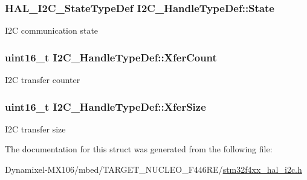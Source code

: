 \subsubsection[{\texorpdfstring{State}{State}}]{ {\bf H\+A\+L\+\_\+\+I2\+C\+\_\+\+State\+Type\+Def} I2\+C\+\_\+\+Handle\+Type\+Def\+::\+State}\hypertarget{struct_i2_c___handle_type_def_a5b37a3a29bc768fb1c3ff192ab94b6e3}{}\label{struct_i2_c___handle_type_def_a5b37a3a29bc768fb1c3ff192ab94b6e3}
I2C communication state 
\subsubsection[{\texorpdfstring{Xfer\+Count}{XferCount}}]{ uint16\+\_\+t I2\+C\+\_\+\+Handle\+Type\+Def\+::\+Xfer\+Count}\hypertarget{struct_i2_c___handle_type_def_a1860b3cf8f463c2751d0c935f33e0ad4}{}\label{struct_i2_c___handle_type_def_a1860b3cf8f463c2751d0c935f33e0ad4}
I2C transfer counter 
\subsubsection[{\texorpdfstring{Xfer\+Size}{XferSize}}]{\setlength{\rightskip}{0pt plus 5cm}uint16\+\_\+t I2\+C\+\_\+\+Handle\+Type\+Def\+::\+Xfer\+Size}\hypertarget{struct_i2_c___handle_type_def_a47afa75961930ab1743f47245fdf6e85}{}\label{struct_i2_c___handle_type_def_a47afa75961930ab1743f47245fdf6e85}
I2C transfer size 

The documentation for this struct was generated from the following file\+:\begin{DoxyCompactItemize}
\item 
Dynamixel-\/\+M\+X106/mbed/\+T\+A\+R\+G\+E\+T\+\_\+\+N\+U\+C\+L\+E\+O\+\_\+\+F446\+R\+E/\hyperlink{stm32f4xx__hal__i2c_8h}{stm32f4xx\+\_\+hal\+\_\+i2c.\+h}\end{DoxyCompactItemize}
